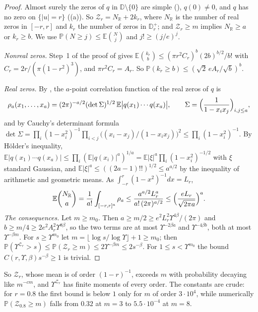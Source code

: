 \documentclass[11pt]{amsart}
\theoremstyle{definition}
\theoremstyle{remark}
\numberwithin{equation}{section}
\newcommand{\R}{\mathbb{R}}
\newcommand{\D}{\mathbb{D}}
\newcommand{\E}{\mathbb{E}}
\newcommand{\PP}{\mathbb{P}}
\begin{document}
\begin{proof}
Almost surely the zeros of $q$ in $\D\setminus\{0\}$ are simple (\cite[Lemma~\ref{M-lem:resample}]{Main}), $q(0)\ne0$, and $q$ has no zero on $\{|u|=r\}$ (\cite[Lemma~\ref{M-lem:circle}]{Main}(a)). So $\mathcal Z_r=N_\R+2k_r$, where $N_\R$ is the number of real zeros in $[-r,r]$ and $k_r$ the number of zeros in $\D_r^+$; and $\mathcal Z_r\ge m$ implies $N_\R\ge a$ or $k_r\ge b$. We use $\PP(N\ge j)\le\E\binom Nj$ and $j!\ge(j/e)^j$.

\emph{Nonreal zeros.} Step~1 of the proof of \cite[Proposition~\ref{M-prop:fredholm}]{Main} gives $\E\binom{k_r}b\le(\pi r^2C_r)^b(2b)^{b/2}/b!$ with $C_r=2r/(\pi(1-r^2)^3)$, and $\pi r^2C_r=A_r$. So $\PP(k_r\ge b)\le(\sqrt2\,eA_r/\sqrt b)^b$.

\emph{Real zeros.} By \cite[Section~6.1, proof of Theorem~2.1]{MS}, the $a$-point correlation function of the real zeros of $q$ is
\[
\rho_a(x_1,\dots,x_a)=(2\pi)^{-a/2}(\det\Sigma)^{1/2}\,\E\bigl|q(x_1)\cdots q(x_a)\bigr|,\qquad\Sigma=\Bigl(\frac1{1-x_ix_j}\Bigr)_{i,j\le a},
\]
and by Cauchy's determinant formula $\det\Sigma=\prod_i(1-x_i^2)^{-1}\prod_{i<j}\bigl((x_i-x_j)/(1-x_ix_j)\bigr)^2\le\prod_i(1-x_i^2)^{-1}$. By H\"older's inequality, $\E|q(x_1)\cdots q(x_a)|\le\prod_i(\E|q(x_i)|^a)^{1/a}=\E|\xi|^a\prod_i(1-x_i^2)^{-1/2}$ with $\xi$ standard Gaussian, and $\E|\xi|^a\le((2a-1)!!)^{1/2}\le a^{a/2}$ by the inequality of arithmetic and geometric means. As $\int_{-r}^r(1-x^2)^{-1}dx=L_r$,
\[
\E\binom{N_\R}a=\frac1{a!}\int_{[-r,r]^a}\rho_a\le\frac{a^{a/2}L_r^a}{a!\,(2\pi)^{a/2}}\le\Bigl(\frac{eL_r}{\sqrt{2\pi a}}\Bigr)^a .
\]
\emph{The consequences.} Let $m\ge m_0$. Then $a\ge m/2\ge e^2L_r^2\Upsilon^{4\beta}/(2\pi)$ and $b\ge m/4\ge2e^2A_r^2\Upsilon^{8\beta}$, so the two terms are at most $\Upsilon^{-2\beta a}$ and $\Upsilon^{-4\beta b}$, both at most $\Upsilon^{-\beta m}$. For $s\ge\Upsilon^{m_0}$ let $m=\lfloor\log s/\log\Upsilon\rfloor+1\ge m_0$; then $\PP(\Upsilon^{\mathcal Z_r}>s)\le\PP(\mathcal Z_r\ge m)\le2\Upsilon^{-\beta m}\le2s^{-\beta}$. For $1\le s<\Upsilon^{m_0}$ the bound $C(r,\Upsilon,\beta)s^{-\beta}\ge1$ is trivial.
\end{proof}

So $\mathcal Z_r$, whose mean is of order $(1-r)^{-1}$, exceeds $m$ with probability decaying like $m^{-cm}$, and $\Upsilon^{\mathcal Z_r}$ has finite moments of every order. The constants are crude: for $r=0.8$ the first bound is below $1$ only for $m$ of order $3\cdot10^4$, while numerically $\PP(\mathcal Z_{0.8}\ge m)$ falls from $0.32$ at $m=3$ to $5.5\cdot10^{-4}$ at $m=8$.
\end{document}
